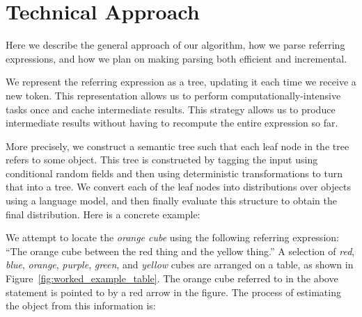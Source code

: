 \documentclass[letterpaper,10pt]{article}
\begin{document}
\section{Technical Approach}

Here we describe the general approach of our algorithm, how we parse referring expressions, and how we plan on making parsing both efficient and incremental.

We represent the referring expression as a tree, updating it each time we receive a new token. This representation allows us to perform computationally-intensive tasks once and cache intermediate results. This strategy allows us to produce intermediate results without having to recompute the entire expression so far.

More precisely, we construct a semantic tree such that each leaf node in the tree refers to some object. This tree is constructed by tagging the input using conditional random fields and then using deterministic transformations to turn that into a tree. We convert each of the leaf nodes into distributions over objects using a language model, and then finally evaluate this structure to obtain the final distribution. Here is a concrete example: 

We attempt to locate the \textit{orange cube} using the following referring expression: ``The orange cube between the red thing and the yellow thing.'' A selection of \textit{red}, \textit{blue}, \textit{orange}, \textit{purple}, \textit{green}, and  \textit{yellow} cubes are arranged on a table, as shown in Figure~\ref{fig:worked_example_table}. The orange cube referred to in the above statement is pointed to by a red arrow in the figure. The process of estimating the object from this information is:
\end{document}
